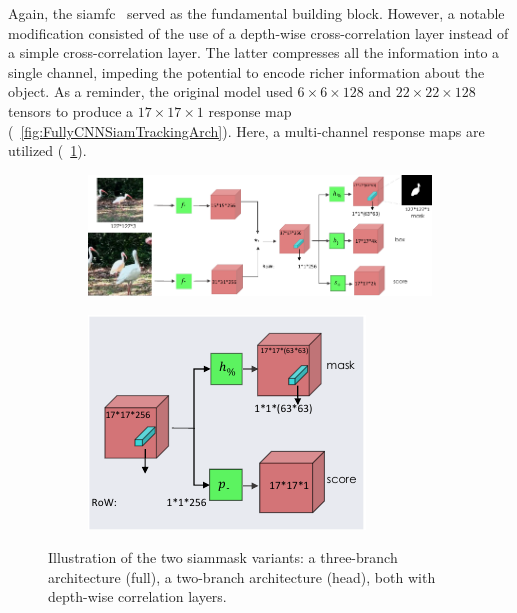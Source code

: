 Again, the \gls{siamfc}~\cite{bertinetto2016siamfc} served as the fundamental building block. However, a notable modification consisted of the use of a depth-wise cross-correlation layer instead of a simple cross-correlation layer. The latter compresses all the information into a single channel, impeding the potential to encode richer information about the object. As a reminder, the original model used $6 \times 6 \times 128$ and $22 \times 22 \times 128$ tensors to produce a $17 \times 17 \times 1$ response map (\figtext{}~\ref{fig:FullyCNNSiamTrackingArch}). Here, a multi-channel response maps are utilized (\figtext{}~\ref{fig:SiamMaskArchitecture}).

\begin{figure}[!t]
    \centering
    \begin{subfigure}[b]{0.68\textwidth}
        \centering
        \includegraphics[width=\textwidth]{figures/theoretical_foundations/siam_mask_architecture_3_branch.pdf}
        \caption[]{}
    \end{subfigure}
    \hfill
    \begin{subfigure}[b]{0.31\textwidth}
        \centering
        \includegraphics[width=\textwidth]{figures/theoretical_foundations/siam_mask_architecture_2_branch_head.pdf}
        \caption[]{}
    \end{subfigure}
    \caption[\Gls{siammask} architecture]{Illustration of the two \gls{siammask} variants:  a three-branch architecture (full),  a two-branch architecture (head), both with depth-wise correlation layers. }
    \label{fig:SiamMaskArchitecture}
\end{figure}


